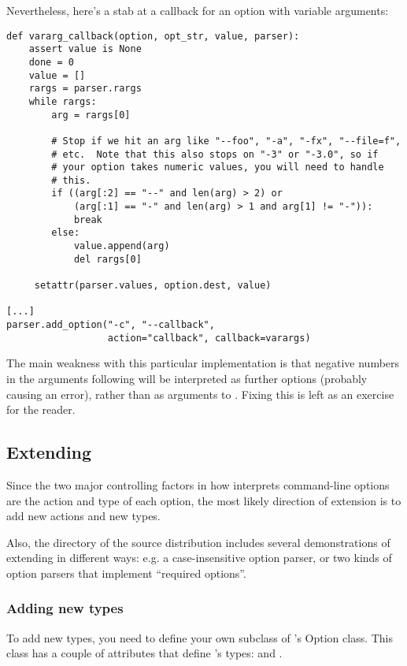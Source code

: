 Nevertheless, here's a stab at a callback for an option with variable
arguments:
\begin{verbatim}
def vararg_callback(option, opt_str, value, parser):
    assert value is None
    done = 0
    value = []
    rargs = parser.rargs
    while rargs:
        arg = rargs[0]

        # Stop if we hit an arg like "--foo", "-a", "-fx", "--file=f",
        # etc.  Note that this also stops on "-3" or "-3.0", so if
        # your option takes numeric values, you will need to handle
        # this.
        if ((arg[:2] == "--" and len(arg) > 2) or
            (arg[:1] == "-" and len(arg) > 1 and arg[1] != "-")):
            break
        else:
            value.append(arg)
            del rargs[0]

     setattr(parser.values, option.dest, value)

[...]
parser.add_option("-c", "--callback",
                  action="callback", callback=varargs)
\end{verbatim}

The main weakness with this particular implementation is that negative
numbers in the arguments following  will be interpreted as
further options (probably causing an error), rather than as arguments to
.  Fixing this is left as an exercise for the reader.


\subsection{Extending \label{optparse-extending-optparse}}

Since the two major controlling factors in how  interprets
command-line options are the action and type of each option, the most
likely direction of extension is to add new actions and new types.

Also, the  directory of the source distribution includes
several demonstrations of extending  in different ways: e.g. a
case-insensitive option parser, or two kinds of option parsers that
implement ``required options''.


\subsubsection{Adding new types\label{optparse-adding-new-types}}

To add new types, you need to define your own subclass of 's Option
class.  This class has a couple of attributes that define 's types:
 and .

